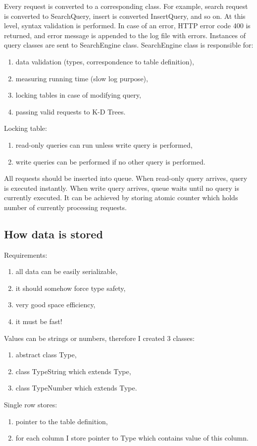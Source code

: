 \documentclass[10pt,a4paper]{article}
\begin{document}
Every request is converted to a corresponding class. For example, search request is converted to SearchQuery,
insert is converted InsertQuery, and so on. At this level, syntax validation is performed. In case of an
error, HTTP error code 400 is returned, and error message is appended to the log file with errors.
Instances of query classes are sent to SearchEngine class. SearchEngine class is responsible for:
\begin{enumerate}
\item data validation (types, correspondence to table definition),
\item measuring running time (slow log purpose),
\item locking tables in case of modifying query,
\item passing valid requests to K-D Trees.
\end{enumerate}

Locking table:
\begin{enumerate}
\item read-only queries can run unless write query is performed,
\item write queries can be performed if no other query is performed.
\end{enumerate}

All requests should be inserted into queue. When read-only query arrives, query is executed instantly. When write query arrives, queue waits until no query is currently executed. It can be achieved by storing atomic counter which holds number of currently processing requests. 

\subsection{How data is stored}
Requirements:
\begin{enumerate}
\item all data can be easily serializable,
\item it should somehow force type safety,
\item very good space efficiency,
\item it must be fast!
\end{enumerate}
Values can be strings or numbers, therefore I created 3 classes:
\begin{enumerate}
\item abstract class Type,
\item class TypeString which extends Type,
\item class TypeNumber which extends Type.
\end{enumerate}
Single row stores:
\begin{enumerate}
\item pointer to the table definition,
\item for each column I store pointer to Type which contains value of this column.
\end{enumerate}
\end{document}
